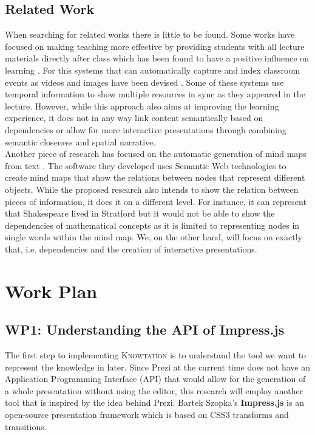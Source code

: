 \documentclass[twoside, 12pt]{article}
\newcommand{\sys}{\textsc{Knowtation}\xspace}
\begin{document}
\subsection{Related Work}
\label{sec:relatedworks}

When searching for related works there is little to be found. Some works have focused on making teaching more effective by providing students with all lecture materials directly after class which has been found to have a positive influence on learning \cite{DBLP:dblp_journals/tochi/BrothertonA04}. For this systems that can automatically capture and index classroom events as videos and images have been devised \cite{indexedclass:npentrel14}. Some of these systems use temporal information \cite{DBLP:dblp_journals/isci/ChungS97} to show multiple resources in sync as they appeared in the lecture. However, while this approach also aims at improving the learning experience, it does not in any way link content semantically based on dependencies or allow for more interactive presentations through combining semantic closeness and spatial narrative.\\

Another piece of research has focused on the automatic generation of mind maps from text \cite{abdeen2009direct}. The software they developed uses Semantic Web technologies to create mind maps that show the relations between nodes that represent different objects. While the proposed research also intends to show the relation between pieces of information, it does it on a different level. For instance, it can represent that Shakespeare lived in Stratford but it would not be able to show the dependencies of mathematical concepts as it is limited to representing nodes in single words within the mind map. We, on the other hand, will focus on exactly that, i.e. dependencies and the creation of interactive presentations.\\


\section{Work Plan}
\label{sec:workplan}

\subsection{WP1: Understanding the API of Impress.js}
\label{sec:wp1}

The first step to implementing \sys is to understand the tool we want to represent the knowledge in later. Since Prezi at the current time does not have an Application Programming Interface (API) that would allow for the generation of a whole presentation without using the editor, this research will employ another tool that is inspired by the idea behind Prezi. Bartek Szopka's \textbf{Impress.js} \cite{JSImpress:npentrel14} is an open-source presentation framework which is based on CSS3 transforms and transitions.\\
\end{document}
